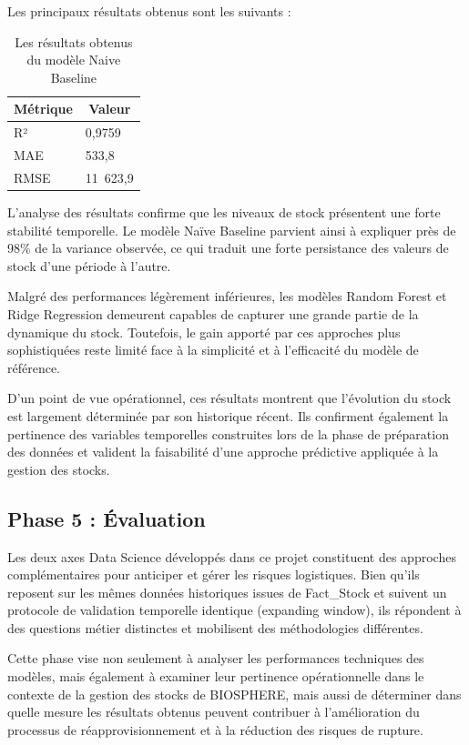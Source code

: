 Les principaux résultats obtenus sont les suivants :
 
\begin{table}[H]
\centering
\caption{Les résultats obtenus du modèle Naive Baseline}
\label{tab:ch4:resultats_naive}
\small
\begin{tabular}{|p{4cm}|p{3cm}|}
\hline
\multicolumn{1}{|c|}{\textbf{Métrique}} & \multicolumn{1}{c|}{\textbf{Valeur}} \\
\hline
R² & 0,9759 \\
\hline
MAE & 533,8 \\
\hline
RMSE & 11~623,9 \\
\hline
\end{tabular}
\end{table}
 
L'analyse des résultats confirme que les niveaux de stock présentent une forte stabilité temporelle. Le modèle Naïve Baseline parvient ainsi à expliquer près de 98\% de la variance observée, ce qui traduit une forte persistance des valeurs de stock d'une période à l'autre.
 
Malgré des performances légèrement inférieures, les modèles Random Forest et Ridge Regression demeurent capables de capturer une grande partie de la dynamique du stock. Toutefois, le gain apporté par ces approches plus sophistiquées reste limité face à la simplicité et à l'efficacité du modèle de référence.
 
D'un point de vue opérationnel, ces résultats montrent que l'évolution du stock est largement déterminée par son historique récent. Ils confirment également la pertinence des variables temporelles construites lors de la phase de préparation des données et valident la faisabilité d'une approche prédictive appliquée à la gestion des stocks.
 
\subsection{Phase 5 : Évaluation}
 
Les deux axes Data Science développés dans ce projet constituent des approches complémentaires pour anticiper et gérer les risques logistiques. Bien qu'ils reposent sur les mêmes données historiques issues de Fact\_Stock et suivent un protocole de validation temporelle identique (expanding window), ils répondent à des questions métier distinctes et mobilisent des méthodologies différentes.
 
Cette phase vise non seulement à analyser les performances techniques des modèles, mais également à examiner leur pertinence opérationnelle dans le contexte de la gestion des stocks de BIOSPHERE, mais aussi de déterminer dans quelle mesure les résultats obtenus peuvent contribuer à l'amélioration du processus de réapprovisionnement et à la réduction des risques de rupture.
 
